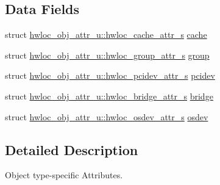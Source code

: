 \subsection*{Data Fields}
\begin{DoxyCompactItemize}
\item 
struct \hyperlink{a00013}{hwloc\_\-obj\_\-attr\_\-u::hwloc\_\-cache\_\-attr\_\-s} \hyperlink{a00017_ab5a8ae3bf490e6b1071fea53f7382836}{cache}
\item 
struct \hyperlink{a00015}{hwloc\_\-obj\_\-attr\_\-u::hwloc\_\-group\_\-attr\_\-s} \hyperlink{a00017_ae4ba157cc313e2cdd9a82f1c1df7aaa6}{group}
\item 
struct \hyperlink{a00022}{hwloc\_\-obj\_\-attr\_\-u::hwloc\_\-pcidev\_\-attr\_\-s} \hyperlink{a00017_a4203d713ce0f5beaa6ee0e9bdac70828}{pcidev}
\item 
struct \hyperlink{a00012}{hwloc\_\-obj\_\-attr\_\-u::hwloc\_\-bridge\_\-attr\_\-s} \hyperlink{a00017_adbdf280699dd84c7619cd8d9edc0d958}{bridge}
\item 
struct \hyperlink{a00021}{hwloc\_\-obj\_\-attr\_\-u::hwloc\_\-osdev\_\-attr\_\-s} \hyperlink{a00017_a22904c25fe44b323bab5c9bc52660fca}{osdev}
\end{DoxyCompactItemize}


\subsection{Detailed Description}
Object type-\/specific Attributes. 

